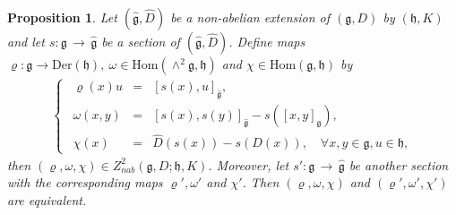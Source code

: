\documentclass[12pt]{amsart}
\newtheorem{pro}[thm]{Proposition}
\newcommand{\lon }{\,\rightarrow\,}
\newcommand{\g}{\mathfrak g}
\newcommand{\h}{\mathfrak h}
\newcommand{\Hom}{\mathrm{Hom}}
\newcommand{\Der}{\mathrm{Der}}
\begin{document}
\begin{pro}\label{sexnoon}
Let $(\hat{\g}, \hat{D})$ be a non-abelian extension of $(\g, D)$ by $(\h, K)$ and let $s:\g\lon\hat{\g}$ be a section of $(\hat{\g}, \hat{D})$. Define maps $\varrho:\g\rightarrow\Der(\h), ~\omega\in\Hom(\wedge^{2}\g,\h)$ and $\chi\in\Hom(\g,\h)$ by
\begin{eqnarray}\label{111}
\left\{\begin{array}{rcl}
~~\varrho(x)u&=&[s(x),u]_{\hat{\g}}, \\
~~\omega(x,y)&=&[s(x),s(y)]_{\hat{\g}}-s([x,y]_\g), \\
~~\chi(x)&=&\hat{D}(s(x))-s(D(x)), \quad \forall x, y\in\g, u\in\h,
\end{array}\right.
\end{eqnarray}
then $(\varrho, \omega, \chi)\in Z^{2}_{nab}(\g,D;\h, K)$. Moreover, let $s':\g\lon\hat{\g}$ be another section with the corresponding maps $\varrho', \omega'$ and $\chi'$. Then $(\varrho, \omega, \chi)$ and $(\varrho', \omega', \chi')$ are equivalent.
\end{pro}
\end{document}
